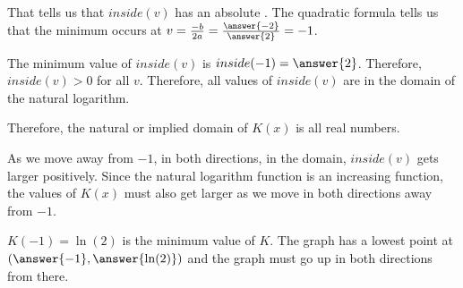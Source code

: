 \documentclass{ximera}
\begin{document}
\begin{example}
That tells us that $inside(v)$ has an absolute .  The quadratic formula tells us that the minimum occurs at $v=\frac{-b}{2a} = \frac{\answer{-2}}{\answer{2}} = -1$.

The minimum value of $inside(v)$ is $inside(-1) = \answer{2}$.  Therefore, $inside(v) > 0$ for all $v$. Therefore, all values of $inside(v)$ are in the domain of the natural logarithm.

Therefore, the natural or implied domain of $K(x)$ is all real numbers.



As we move away from $-1$, in both directions, in the domain, $inside(v)$ gets larger positively. Since the natural logarithm function is an increasing function, the values of $K(x)$ must also get larger as we move in both directions away from $-1$.




$K(-1) = \ln(2)$ is the minimum value of $K$.  The graph has a lowest point at $\left( \answer{-1}, \answer{\ln(2)} \right)$ and the graph must go up in both directions from there.








\begin{image}
\end{image}
\end{example}
\end{document}
